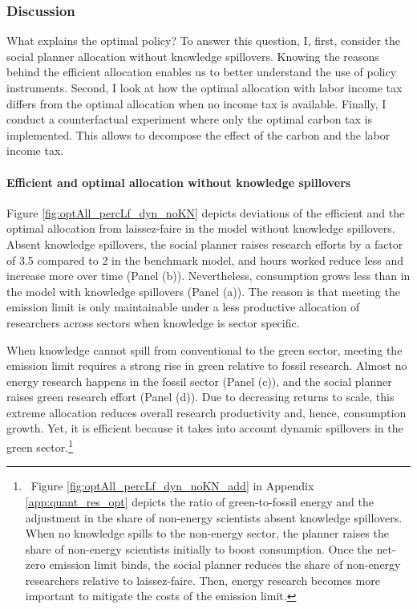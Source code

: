 
\subsubsection{Discussion}\label{subsec:dis}

 What explains the optimal policy?  To answer this question, I, first, consider the social planner allocation without knowledge spillovers. Knowing the reasons behind the efficient allocation enables us to better understand the use of policy instruments. Second, I look at how the optimal allocation with labor income tax differs from the optimal allocation when no income tax is available. 
Finally, I conduct a counterfactual experiment where only the optimal carbon tax is implemented. This allows to decompose the effect of the carbon and the labor income tax. 

\paragraph{Efficient and optimal allocation without knowledge spillovers}
Figure \ref{fig:optAll_percLf_dyn_noKN} depicts deviations of the efficient and the optimal allocation from laissez-faire in the model without knowledge spillovers.
Absent knowledge spillovers, the social planner raises research efforts  by a factor of 3.5 compared to 2 in the benchmark model, and hours worked reduce less and increase more over time (Panel (b)). Nevertheless, consumption grows less than in the model with knowledge spillovers (Panel (a)). The reason is that meeting the emission limit is only maintainable under a less productive allocation of researchers across sectors when knowledge is sector specific. 

 When knowledge cannot spill from conventional to the green sector, meeting the emission limit requires a strong rise in green relative to fossil research. Almost no energy research happens in the fossil sector (Panel (c)), and the social planner raises green research effort (Panel (d)). Due to decreasing returns to scale, this extreme allocation reduces overall research productivity and, hence, consumption growth. Yet, it is efficient because it takes into account dynamic spillovers in the green sector.\footnote{\ Figure \ref{fig:optAll_percLf_dyn_noKN_add} in Appendix \ref{app:quant_res_opt} depicts the ratio of green-to-fossil energy and the adjustment in the share of non-energy scientists absent knowledge spillovers. When no knowledge spills to the non-energy sector, the planner raises the share of non-energy scientists initially to boost consumption. Once the net-zero emission limit binds, the social planner reduces the share of non-energy researchers relative to laissez-faire. Then, energy research becomes more important to mitigate the costs of the emission limit.}
 
